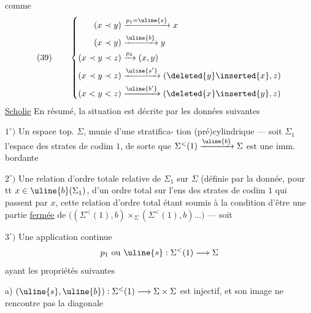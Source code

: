 comme
\[
(39)\qquad\left\{\begin{aligned}
(x\prec y)&\xrightarrow{p_1=\uline{s}}x\\
(x\prec y)&\xrightarrow{\uline{b}}y\\
(x\prec y\prec z)&\xrightarrow{p_2}(x,y)\\
(x\prec y\prec z)&\xrightarrow{\uline{s'}}(\deleted{y}\inserted{x},z)\\
(x<y<z)&\xrightarrow{\uline{b'}}(\deleted{x}\inserted{y},z)
\end{aligned}\right.
\]
\uline{Scholie} En résumé, la situation est décrite
par les données suivantes

$1^{\circ})$ Un espace top.  $\Sigma$, munie d'une stratifica-
tion (pré)cylindrique --- soit $\Sigma_1$ l'espace des strates de
codim $1$, de sorte que $\Sigma^{<}(1)\xrightarrow{\uline{b}}\Sigma$ est une imm. bordante

$2^{\circ})$ Une relation d'ordre totale relative de $\Sigma_1$ sur $\Sigma$
(définie par la donnée, pour tt $x\in\uline{b}(\Sigma_1)$, d'un
ordre total sur l'ens des strates de codim $1$
qui passent par $x$, cette relation d'ordre total étant
soumis à la condition d'être  une partie \uline{fermée}
 de $\bigl((\Sigma^{<}(1),b)\times_\Sigma(\Sigma^{<}(1),b)\ldots\bigr)$ --- soit

$3^{\circ})$ Une application continue
\[
p_1\text{ ou }\uline{s}:\Sigma^{<}(1)\longrightarrow\Sigma
\]
ayant les propriétés suivantes

a) $(\uline{s},\uline{b}):\Sigma^{<}(1)\longrightarrow\Sigma\times\Sigma$ est injectif, et
son image ne
rencontre pas la
diagonale 

